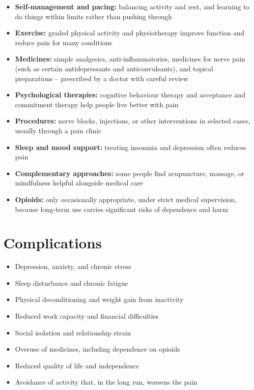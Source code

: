 \begin{itemize}
    \item \textbf{Self-management and pacing:} balancing activity and rest, and learning to do things within limits rather than pushing through
    \item \textbf{Exercise:} graded physical activity and physiotherapy improve function and reduce pain for many conditions
    \item \textbf{Medicines:} simple analgesics, anti-inflammatories, medicines for nerve pain (such as certain antidepressants and anticonvulsants), and topical preparations -- prescribed by a doctor with careful review
    \item \textbf{Psychological therapies:} cognitive behaviour therapy and acceptance and commitment therapy help people live better with pain
    \item \textbf{Procedures:} nerve blocks, injections, or other interventions in selected cases, usually through a pain clinic
    \item \textbf{Sleep and mood support:} treating insomnia and depression often reduces pain
    \item \textbf{Complementary approaches:} some people find acupuncture, massage, or mindfulness helpful alongside medical care
    \item \textbf{Opioids:} only occasionally appropriate, under strict medical supervision, because long-term use carries significant risks of dependence and harm
\end{itemize}

\section*{Complications}
\begin{itemize}
    \item Depression, anxiety, and chronic stress
    \item Sleep disturbance and chronic fatigue
    \item Physical deconditioning and weight gain from inactivity
    \item Reduced work capacity and financial difficulties
    \item Social isolation and relationship strain
    \item Overuse of medicines, including dependence on opioids
    \item Reduced quality of life and independence
    \item Avoidance of activity that, in the long run, worsens the pain
\end{itemize}

